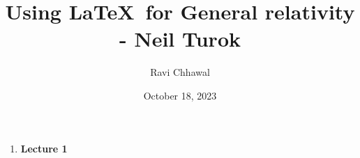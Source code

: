 \documentclass[11pt,a4paper]{article}
\title{Using \LaTeX\ for General relativity - Neil Turok}
\author{Ravi Chhawal}
\date{October 18, 2023}
\begin{document}
\maketitle
\begin{enumerate}
    \item \textbf{\LARGE Lecture 1}

\end{enumerate}
\end{document}
